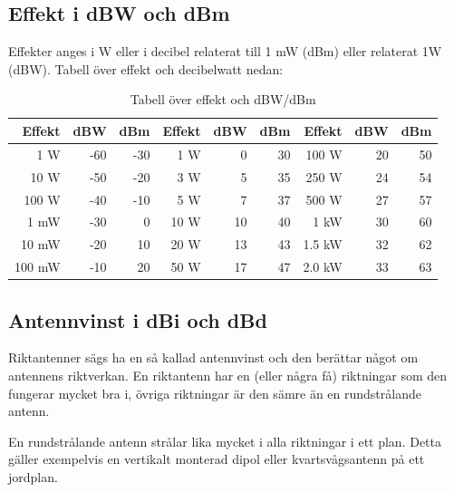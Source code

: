 \subsection{Effekt i dBW och dBm}

Effekter anges i W eller i decibel relaterat till 1 mW (dBm) eller relaterat
1W (dBW). Tabell över effekt och decibelwatt nedan:

\begin{table}[H]
\centering
\begin{tabular}{rrr|rrr|rrr}
	\textbf{Effekt} & \textbf{dBW} & \textbf{dBm} & \textbf{Effekt} & \textbf{dBW} & \textbf{dBm} & \textbf{Effekt} & \textbf{dBW} & \textbf{dBm} \\ \hline
	    1 \textmu W &          -60 &          -30 &             1 W &            0 &           30 &           100 W &           20 &           50 \\
	   10 \textmu W &          -50 &          -20 &             3 W &            5 &           35 &           250 W &           24 &           54 \\
	  100 \textmu W &          -40 &          -10 &             5 W &            7 &           37 &           500 W &           27 &           57 \\
	           1 mW &          -30 &            0 &            10 W &           10 &           40 &            1 kW &           30 &           60 \\
	          10 mW &          -20 &           10 &            20 W &           13 &           43 &          1.5 kW &           32 &           62 \\
	         100 mW &          -10 &           20 &            50 W &           17 &           47 &          2.0 kW &           33 &           63
\end{tabular}
\caption{Tabell över effekt och dBW/dBm}
\end{table}

\subsection{Antennvinst i dBi och dBd}

Riktantenner sägs ha en så kallad antennvinst och den berättar något om
antennens riktverkan. En riktantenn har en (eller några få) riktningar som den
fungerar mycket bra i, övriga riktningar är den sämre än en rundstrålande
antenn.

En rundstrålande antenn strålar lika mycket i alla riktningar i ett plan.
Detta gäller exempelvis en vertikalt monterad dipol eller kvartsvågsantenn på
ett jordplan.

